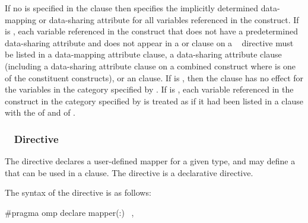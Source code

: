 If no  is specified in the clause then
 specifies the implicitly determined data-mapping or
data-sharing attribute for all variables referenced in the construct.
If  is , each variable referenced in the
construct that does not have a predetermined data-sharing attribute and does
not appear in a  or  clause on a ~
directive must be listed in a data-mapping attribute clause, a data-sharing
attribute clause (including a data-sharing attribute clause on a combined
construct where  is one of the constituent constructs), or
an  clause.
If  is ,
then the clause has no effect for the variables in the category specified by
.
If  is , each variable  referenced in the
construct in the category specified by  is treated as if it
had been listed in a  clause with the  of 
and  of .



\subsubsection{~ Directive}
\label{subsubsec:declare mapper Directive}

\summary

The  directive declares a user-defined mapper for a given
type, and may define a  that can be used in a 
clause. The  directive is a declarative directive.

\syntax
\begin{ccppspecific}
The syntax of the  directive is as follows:

\begin{ompcPragma}
#pragma omp declare mapper(\plc{[mapper-identifier}:\plc{]type var}) \
            \plc{[clause[ [},\plc{] clause] ... ] new-line}
\end{ompcPragma}

\end{ccppspecific}

